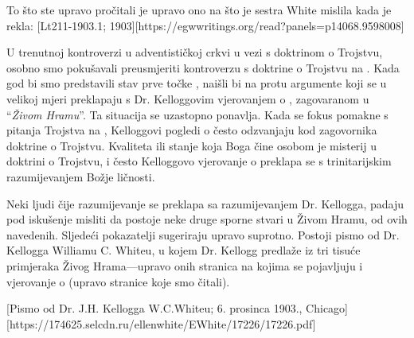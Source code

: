 To što ste upravo pročitali je upravo ono na što je sestra White mislila kada je rekla: [Lt211-1903.1; 1903][https://egwwritings.org/read?panels=p14068.9598008]

U trenutnoj kontroverzi u adventističkoj crkvi u vezi s doktrinom o Trojstvu, osobno smo pokušavali preusmjeriti kontroverzu s doktrine o Trojstvu na . Kada god bi smo predstavili stav prve točke , naišli bi na protu argumente koji se u velikoj mjeri preklapaju s Dr. Kelloggovim vjerovanjem o , zagovaranom u “\textit{Živom Hramu}”. Ta situacija se uzastopno ponavlja. Kada se fokus pomakne s pitanja Trojstva na , Kelloggovi pogledi o  često odzvanjaju kod zagovornika doktrine o Trojstvu. Kvaliteta ili stanje koja Boga čine osobom je misterij u doktrini o Trojstvu, i često Kelloggovo vjerovanje o  preklapa se s trinitarijskim razumijevanjem Božje ličnosti.

Neki ljudi čije razumijevanje  se preklapa sa razumijevanjem Dr. Kellogga, padaju pod iskušenje misliti da postoje neke druge sporne stvari u Živom Hramu, od ovih navedenih. Sljedeći pokazatelji sugeriraju upravo suprotno. Postoji pismo od Dr. Kellogga Williamu C. Whiteu, u kojem Dr. Kellogg predlaže  iz tri tisuće primjeraka Živog Hrama—upravo onih stranica na kojima se pojavljuju  i vjerovanje o  (upravo stranice koje smo čitali).

[Pismo od Dr. J.H. Kellogga W.C.Whiteu; 6. prosinca 1903., Chicago][https://174625.selcdn.ru/ellenwhite/EWhite/17226/17226.pdf]

